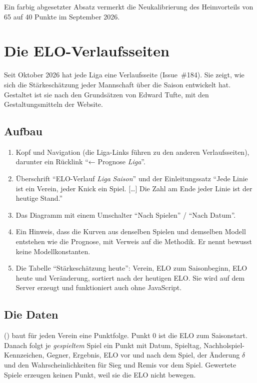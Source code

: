 Ein farbig abgesetzter Absatz vermerkt die Neukalibrierung des
Heimvorteils von 65 auf 40 Punkte im September 2026.

\section{Die ELO-Verlaufsseiten}\label{sec:verlauf}

Seit Oktober 2026 hat jede Liga eine Verlaufsseite (Issue~\#184). Sie zeigt,
wie sich die Stärkeschätzung jeder Mannschaft über die Saison entwickelt hat.
Gestaltet ist sie nach den Grundsätzen von Edward Tufte, mit den
Gestaltungsmitteln der Website.


\subsection*{Aufbau}

\begin{enumerate}
  \item Kopf und Navigation (die Liga-Links führen zu den anderen
        Verlaufsseiten), darunter ein Rücklink \enquote{← Prognose \emph{Liga}}.
  \item Überschrift \enquote{ELO-Verlauf \emph{Liga} \emph{Saison}} und der
        Einleitungssatz \enquote{Jede Linie ist ein Verein, jeder Knick ein
        Spiel. […] Die Zahl am Ende jeder Linie ist der heutige Stand.}
  \item Das Diagramm mit einem Umschalter \enquote{Nach Spielen} /
        \enquote{Nach Datum}.
  \item Ein Hinweis, dass die Kurven aus denselben Spielen und demselben
        Modell entstehen wie die Prognose, mit Verweis auf die Methodik. Er
        nennt bewusst keine Modellkonstanten.
  \item Die Tabelle \enquote{Stärkeschätzung heute}: Verein, ELO zum
        Saisonbeginn, ELO heute und Veränderung, sortiert nach der heutigen
        ELO. Sie wird auf dem Server erzeugt und funktioniert auch ohne
        JavaScript.
\end{enumerate}

\subsection*{Die Daten}

 () baut für
jeden Verein eine Punktfolge. Punkt 0 ist die ELO zum Saisonstart. Danach
folgt je \emph{gespieltem} Spiel ein Punkt mit Datum, Spieltag,
Nachholspiel-Kennzeichen, Gegner, Ergebnis, ELO vor und nach dem Spiel, der
Änderung $\delta$ und den Wahrscheinlichkeiten für Sieg und Remis vor dem
Spiel. Gewertete Spiele erzeugen keinen Punkt, weil sie die ELO nicht
bewegen.


